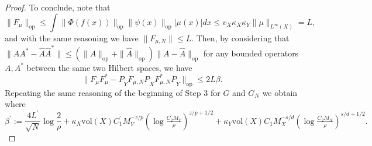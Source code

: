 \begin{proof}
To conclude, note that
$$\|F_{\mu}\|_{\mathrm{op}} \leq \int \|\Phi(f(x))\|_{\mathrm{op}}\|\psi(x)\|_{\mathrm{op}} |\mu(x)| dx \leq v_X \kappa_X \kappa_Y \|\mu\|_{L^\infty(X)} = L,$$
and with the same reasoning we have $\|F_{\mu,N}\| \leq L$. Then, by considering that $\|AA^* - \hat{A}\hat{A}^*\| \leq (\|A\|_{\mathrm{op}} + \|\hat{A}\|_{\mathrm{op}})\|A-\hat{A}\|_{\mathrm{op}}$ for any bounded operators $A,A^*$ between the same two Hilbert spaces, we have
$$
\|F_\mu F_{\mu}^* - P_{\tilde{Y}}F_{\mu,N} P_{\tilde{X}} F_{\mu,N}^*P_{\tilde{Y}}\|_{\mathrm{op}} \leq 2L \beta.
$$
Repeating the same reasoning of the beginning of Step 3 for $G$ and $G_N$ we obtain
where
$$
\beta^\prime := \frac{4 L^\prime}{\sqrt{N}} \log \frac{2}{\rho} + \kappa_X \textrm{vol}(X) C^\prime_1 M_Y^{-z/p} (\log \tfrac{C^\prime_2 M_Y}{\rho})^{z/p+1/2} + \kappa_Y \textrm{vol}(X) C_1 M_X^{-s/d} (\log \tfrac{C_2 M_X}{\rho})^{s/d+1/2}.
$$




\end{proof}

